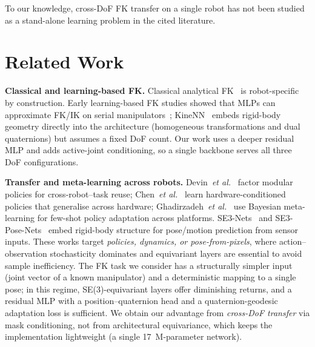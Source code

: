 \documentclass[conference]{IEEEtran}
\begin{document}
To our knowledge, cross-DoF FK transfer on a single robot has not been studied as a stand-alone learning problem in the cited literature.

\section{Related Work}\label{sec:related}

\textbf{Classical and learning-based FK.}
Classical analytical FK~\cite{siciliano2009} is robot-specific by construction. Early learning-based FK studies showed that MLPs can approximate FK/IK on serial manipulators~\cite{duka2014,koker2004}; KineNN~\cite{diprasetya2025} embeds rigid-body geometry directly into the architecture (homogeneous transformations and dual quaternions) but assumes a fixed DoF count. Our work uses a deeper residual MLP and adds active-joint conditioning, so a single backbone serves all three DoF configurations.

\textbf{Transfer and meta-learning across robots.}
Devin~\emph{et al.}~\cite{devin2017} factor modular policies for cross-robot--task reuse; Chen~\emph{et al.}~\cite{chen2018} learn hardware-conditioned policies that generalise across hardware; Ghadirzadeh~\emph{et al.}~\cite{ghadirzadeh2021} use Bayesian meta-learning for few-shot policy adaptation across platforms. SE3-Nets~\cite{byravan2017} and SE3-Pose-Nets~\cite{byravan2018} embed rigid-body structure for pose/motion prediction from sensor inputs. These works target \emph{policies, dynamics, or pose-from-pixels}, where action--observation stochasticity dominates and equivariant layers are essential to avoid sample inefficiency. The FK task we consider has a structurally simpler input (joint vector of a known manipulator) and a deterministic mapping to a single pose; in this regime, SE(3)-equivariant layers offer diminishing returns, and a residual MLP with a position--quaternion head and a quaternion-geodesic adaptation loss is sufficient. We obtain our advantage from \emph{cross-DoF transfer} via mask conditioning, not from architectural equivariance, which keeps the implementation lightweight (a single 17~M-parameter network).
\end{document}
